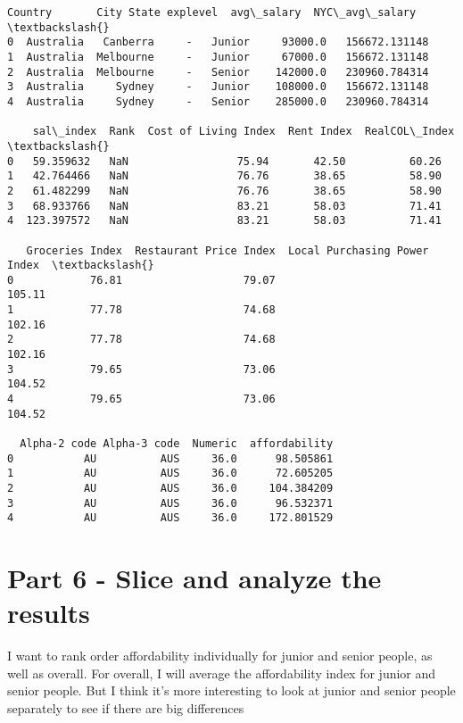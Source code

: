 \documentclass[11pt]{article}
\begin{document}
    \begin{Verbatim}[commandchars=\\\{\}]
     Country       City State explevel  avg\_salary  NYC\_avg\_salary  \textbackslash{}
0  Australia   Canberra     -   Junior     93000.0   156672.131148
1  Australia  Melbourne     -   Junior     67000.0   156672.131148
2  Australia  Melbourne     -   Senior    142000.0   230960.784314
3  Australia     Sydney     -   Junior    108000.0   156672.131148
4  Australia     Sydney     -   Senior    285000.0   230960.784314

    sal\_index  Rank  Cost of Living Index  Rent Index  RealCOL\_Index  \textbackslash{}
0   59.359632   NaN                 75.94       42.50          60.26
1   42.764466   NaN                 76.76       38.65          58.90
2   61.482299   NaN                 76.76       38.65          58.90
3   68.933766   NaN                 83.21       58.03          71.41
4  123.397572   NaN                 83.21       58.03          71.41

   Groceries Index  Restaurant Price Index  Local Purchasing Power Index  \textbackslash{}
0            76.81                   79.07                        105.11
1            77.78                   74.68                        102.16
2            77.78                   74.68                        102.16
3            79.65                   73.06                        104.52
4            79.65                   73.06                        104.52

  Alpha-2 code Alpha-3 code  Numeric  affordability
0           AU          AUS     36.0      98.505861
1           AU          AUS     36.0      72.605205
2           AU          AUS     36.0     104.384209
3           AU          AUS     36.0      96.532371
4           AU          AUS     36.0     172.801529
    \end{Verbatim}

    \hypertarget{part-6---slice-and-analyze-the-results}{%
\section{Part 6 - Slice and analyze the
results}\label{part-6---slice-and-analyze-the-results}}

    I want to rank order affordability individually for junior and senior
people, as well as overall. For overall, I will average the
affordability index for junior and senior people. But I think it's more
interesting to look at junior and senior people separately to see if
there are big differences
\end{document}

